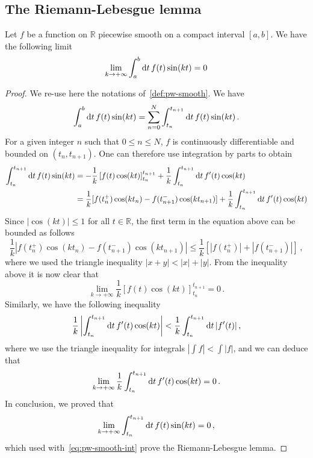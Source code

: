 \subsection{The Riemann-Lebesgue lemma}
\begin{theorem}
  Let $f$ be a function on $\mathbb{R}$ piecewise smooth on a compact interval
  $[a,b]$. We have the following limit
  \begin{equation}
    \lim_{k\to+\infty}\int_a^b\mathrm{d} t\, f(t)\sin(kt)=0
  \end{equation}
\end{theorem}
\begin{proof}
  We re-use here the notations of~\cref{def:pw-smooth}. We have
  \begin{equation}
    \int_a^b\mathrm{d} t\, f(t)\sin(kt)=\sum_{n=0}^{N}\int_{t_n}^{t_{n+1}}\mathrm{d} t\, f(t)\sin(kt)\,.
    \label{eq:pw-smooth-int}
  \end{equation}
  For a given integer $n$ such that $0\leq n \leq N$, $f$ is continuously differentiable and bounded
  on $(t_n,t_{n+1})$. One can therefore use integration by parts to obtain
  \begin{align}
    \int_{t_n}^{t_{n+1}}\mathrm{d} t\, f(t)\sin(kt)&=-\frac{1}{k}\left[f(t)\cos(kt)\right]_{t_n}^{t_{n+1}}
    +\frac{1}{k}\int_{t_n}^{t_{n+1}}\mathrm{d} t\, f'(t)\cos(kt)\notag\\
    &=\frac{1}{k}[f(t_n^+)\cos(kt_n)-f(t_{n+1}^-)\cos(kt_{n+1})]
    +\frac{1}{k}\int_{t_n}^{t_{n+1}}\mathrm{d} t\, f'(t)\cos(kt)
  \end{align}
  Since $|\cos(kt)|\leq 1$ for all $t\in\mathbb{R}$, the first term in the equation above can be bounded as follows
  \begin{equation}
    \frac{1}{k}|f(t_n^+)\cos(kt_n)-f(t_{n+1}^-)\cos(kt_{n+1})|\leq
    \frac{1}{k}[|f(t_n^+)|+|f(t_{n+1}^-)|]\,,
  \end{equation}
  where we used the triangle inequality $|x+y|<|x|+|y|$. From the inequality above it is
  now clear that
  \begin{equation}
    \lim_{k\to+\infty}\frac{1}{k}\left[f(t)\cos(kt)\right]_{t_n}^{t_{n+1}}=0\,.
  \end{equation}
  Similarly, we have the following inequality
  \begin{equation}
    \frac{1}{k}\left|\int_{t_n}^{t_{n+1}}\mathrm{d} t\, f'(t)\cos(kt)\right|
    <\frac{1}{k}\int_{t_n}^{t_{n+1}}\mathrm{d} t\, |f'(t)|\,,
  \end{equation}
  where we use the triangle inequality for integrals $|\int f|<\int |f|$, and we can deduce that
  \begin{equation}
    \lim_{k\to+\infty}\frac{1}{k}\int_{t_n}^{t_{n+1}}\mathrm{d} t\, f'(t)\cos(kt) =0\,.
  \end{equation}
  In conclusion, we proved that
  \begin{equation}
    \lim_{k\to+\infty}\int_{t_n}^{t_{n+1}}\mathrm{d} t\, f(t)\sin(kt)=0\,,
  \end{equation}
  which used with~\cref{eq:pw-smooth-int} prove the Riemann-Lebesgue lemma.
\end{proof}
